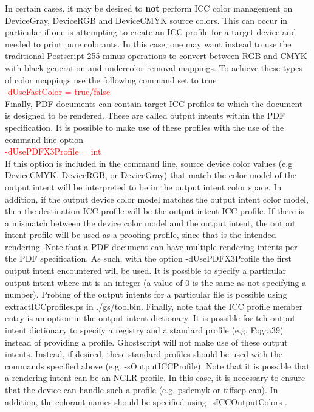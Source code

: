 \documentclass[12pt,notitlepage]{article}
\begin{document}
In certain cases, it may be desired to {\bf not} perform ICC color management on DeviceGray, DeviceRGB and DeviceCMYK source colors.  This can occur in particular if one is attempting to create an ICC profile for a target device and needed to print pure colorants.  In this case, one may want instead to use the traditional Postscript 255 minus operations to convert between RGB and CMYK with black generation and undercolor removal mappings.  To achieve these types of color mappings use the following command set to true\\

\textcolor{red}{-dUseFastColor = true/false}\\

Finally, PDF documents can contain target ICC profiles to which the document is designed to be rendered.  These are called output intents within the PDF specification.   It is possible to make use of these profiles with the use of the command line option\\

\textcolor{red}{-dUsePDFX3Profile = int}\\

If this option is included in the command line, source device color values (e.g DeviceCMYK, DeviceRGB, or DeviceGray) that match the color model of the output intent will be interpreted to be in the output intent color space. In addition, if the output device color model matches the output intent color model, then the destination ICC profile will be the output intent ICC profile. If there is a mismatch between the device color model and the output intent, the output intent profile will be used as a proofing profile, since that is the intended rendering. Note that a PDF document can have multiple rendering intents per the PDF specification. As such, with the option -dUsePDFX3Profile the first output intent encountered will be used. It is possible to specify a particular output intent where int is an integer (a value of 0 is the same as not specifying a number). Probing of the output intents for a particular file is possible using extractICCprofiles.ps in ./gs/toolbin. Finally, note that the ICC profile member entry is an option in the output intent dictionary. It is possible for teh output intent dictionary to specify a registry and a standard profile (e.g. Fogra39) instead of providing a profile. Ghostscript will not make use of these output intents. Instead, if desired, these standard profiles should be used with the commands specified above (e.g. -sOutputICCProfile).  Note that it is possible that a rendering intent can be an NCLR profile.  In this case, it is necessary to ensure that the device can handle such a profile (e.g. psdcmyk or tiffsep can).  In addition, the colorant names should be specified using -sICCOutputColors .
\end{document}
